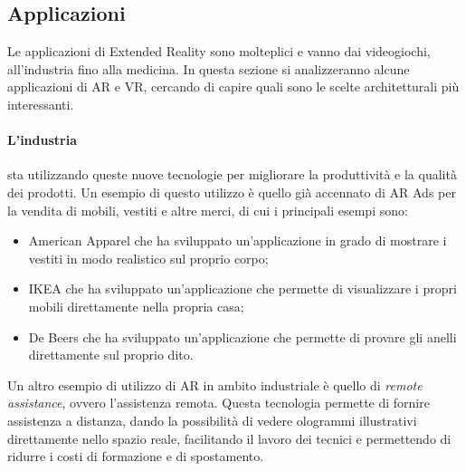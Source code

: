     \subsection{Applicazioni}\label{subsec:XRapplicazioni}
        Le applicazioni di Extended Reality sono molteplici e vanno dai videogiochi, all'industria fino alla medicina. In questa sezione si analizzeranno alcune applicazioni di AR e VR, 
        cercando di capire quali sono le scelte architetturali più interessanti.
        \paragraph{L'industria} sta utilizzando queste nuove tecnologie per migliorare la produttività e la qualità dei prodotti. Un esempio di questo utilizzo è quello già
            accennato di AR Ads per la vendita di mobili, vestiti e altre merci, di cui i principali esempi sono:
            \begin{itemize}
                \item American Apparel che ha sviluppato un'applicazione in grado di mostrare i vestiti in modo realistico sul proprio corpo;
                \item IKEA che ha sviluppato un'applicazione che permette di visualizzare i propri mobili direttamente nella propria casa;
                \item De Beers che ha sviluppato un'applicazione che permette di provare gli anelli direttamente sul proprio dito.
            \end{itemize} 
            Un altro esempio di utilizzo di AR in ambito industriale è quello di \textit{remote assistance}, ovvero l'assistenza remota. Questa tecnologia permette di fornire 
            assistenza a distanza, dando la possibilità di vedere ologrammi illustrativi direttamente nello spazio reale, facilitando il lavoro dei tecnici e permettendo di 
            ridurre i costi di formazione e di spostamento.\\

